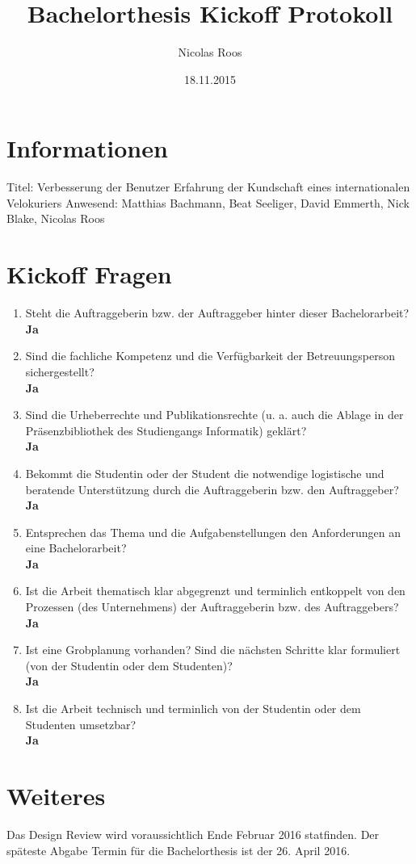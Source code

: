 \documentclass[a4paper]{article}
\begin{document}
\title{Bachelorthesis Kickoff Protokoll}
\author{Nicolas Roos}
\date{18.11.2015}
\maketitle

\section{Informationen}

Titel: Verbesserung der Benutzer Erfahrung der Kundschaft eines internationalen Velokuriers
\newline{}
\newline{}
Anwesend: Matthias Bachmann, Beat Seeliger, David Emmerth, Nick Blake, Nicolas Roos

\section{Kickoff Fragen}

\begin{enumerate}
\item Steht die Auftraggeberin bzw. der Auftraggeber hinter dieser Bachelorarbeit? \\ \textbf{Ja}
\item Sind die fachliche Kompetenz und die Verfügbarkeit der Betreuungsperson sichergestellt? \\ \textbf{Ja}
\item Sind die Urheberrechte und Publikationsrechte (u. a. auch die Ablage in der Präsenzbibliothek des Studiengangs Informatik) geklärt? \\ \textbf{Ja}
\item Bekommt die Studentin oder der Student die notwendige logistische und beratende Unterstützung durch die Auftraggeberin bzw. den Auftraggeber? \\ \textbf{Ja}
\item Entsprechen das Thema und die Aufgabenstellungen den Anforderungen an eine Bachelorarbeit? \\ \textbf{Ja}
\item Ist die Arbeit thematisch klar abgegrenzt und terminlich entkoppelt von den Prozessen (des Unternehmens) der Auftraggeberin bzw. des Auftraggebers? \\ \textbf{Ja}
\item Ist eine Grobplanung vorhanden? Sind die nächsten Schritte klar formuliert (von der Studentin oder dem Studenten)? \\ \textbf{Ja}
\item Ist die Arbeit technisch und terminlich von der Studentin oder dem Studenten umsetzbar? \\ \textbf{Ja}
\end{enumerate}

\section{Weiteres}

Das Design Review wird voraussichtlich Ende Februar 2016 statfinden. Der späteste Abgabe Termin für die Bachelorthesis ist der 26. April 2016.
\end{document}
